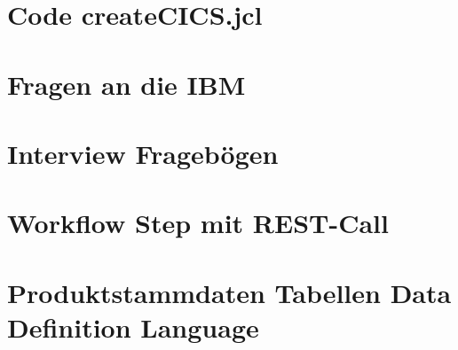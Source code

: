 \section{Code createCICS.jcl}\label{app:createcics}


\section{Fragen an die IBM}\label{app:ibm}



\section{Interview Fragebögen}\label{app:fragen}










\section{Workflow Step mit REST-Call}\label{app:db2prov}


\section{Produktstammdaten Tabellen Data Definition Language}\label{app:ddl}

\pagebreak